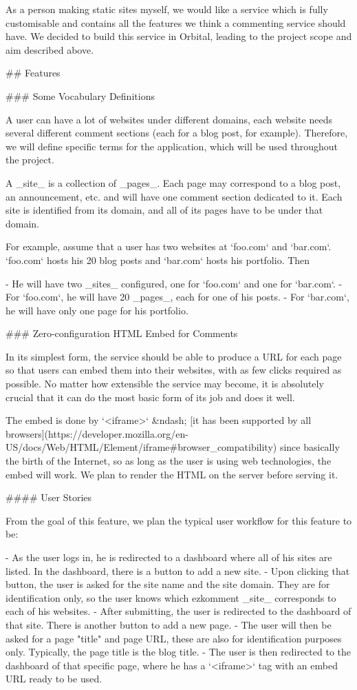 \documentclass[11pt]{article}
\begin{document}
\begin{markdown}
As a person making static sites myself, we would like a service which is fully customisable and contains all the features we think a commenting service should have. We decided to build this service in Orbital, leading to the project scope and aim described above.

## Features

### Some Vocabulary Definitions

A user can have a lot of websites under different domains, each website needs several different comment sections (each for a blog post, for example). Therefore, we will define specific terms for the application, which will be used throughout the project.

A _site_ is a collection of _pages_. Each page may correspond to a blog post, an announcement, etc. and will have one comment section dedicated to it. Each site is identified from its domain, and all of its pages have to be under that domain.

For example, assume that a user has two websites at `foo.com` and `bar.com`. `foo.com` hosts his 20 blog posts and `bar.com` hosts his portfolio. Then

- He will have two _sites_ configured, one for `foo.com` and one for `bar.com`.
- For `foo.com`, he will have 20 _pages_, each for one of his posts.
- For `bar.com`, he will have only one page for his portfolio.

### Zero-configuration HTML Embed for Comments

In its simplest form, the service should be able to produce a URL for each page so that users can embed them into their websites, with as few clicks required as possible. No matter how extensible the service may become, it is absolutely crucial that it can do the most basic form of its job and does it well.

The embed is done by `<iframe>` &ndash; [it has been supported by all browsers](https://developer.mozilla.org/en-US/docs/Web/HTML/Element/iframe#browser_compatibility) since basically the birth of the Internet, so as long as the user is using web technologies, the embed will work. We plan to render the HTML on the server before serving it.

#### User Stories

From the goal of this feature, we plan the typical user workflow for this feature to be:

- As the user logs in, he is redirected to a dashboard where all of his sites are listed. In the dashboard, there is a button to add a new site.
- Upon clicking that button, the user is asked for the site name and the site domain. They are for identification only, so the user knows which ezkomment _site_ corresponds to each of his websites.
- After submitting, the user is redirected to the dashboard of that site. There is another button to add a new page.
- The user will then be asked for a page "title" and page URL, these are also for identification purposes only. Typically, the page title is the blog title.
- The user is then redirected to the dashboard of that specific page, where he has a `<iframe>` tag with an embed URL ready to be used.


\end{markdown}
\end{document}
